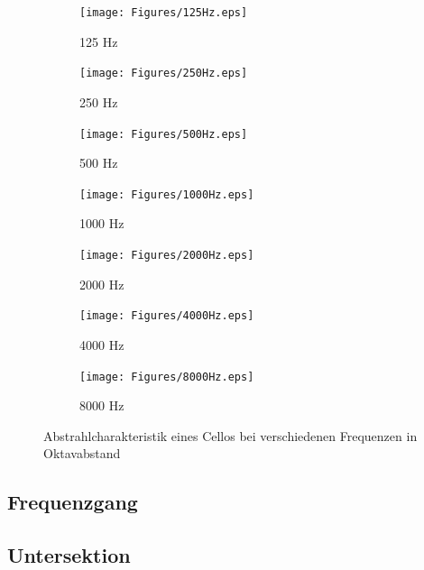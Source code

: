 \begin{figure}[bth]
    \centering
    \begin{subfigure}{.5\textwidth}
        \centering
        \caption{125 Hz}
        \texttt{[image: Figures/125Hz.eps]}
    \end{subfigure}%
    \begin{subfigure}{.5\textwidth}
        \centering
        \caption{250 Hz}
        \texttt{[image: Figures/250Hz.eps]}
    \end{subfigure}

    \begin{subfigure}{.5\textwidth}
        \centering
        \caption{500 Hz}
        \texttt{[image: Figures/500Hz.eps]}
    \end{subfigure}%
    \begin{subfigure}{.5\textwidth}
        \centering
        \caption{1000 Hz}
        \texttt{[image: Figures/1000Hz.eps]}
    \end{subfigure}

    \begin{subfigure}{.5\textwidth}
        \centering
        \caption{2000 Hz}
        \texttt{[image: Figures/2000Hz.eps]}
    \end{subfigure}%
    \begin{subfigure}{.5\textwidth}
        \centering
        \caption{4000 Hz}
        \texttt{[image: Figures/4000Hz.eps]}
    \end{subfigure}

    \begin{subfigure}{.5\textwidth}
        \centering
        \caption{8000 Hz}
        \texttt{[image: Figures/8000Hz.eps]}
    \end{subfigure}

    \caption{Abstrahlcharakteristik eines Cellos bei verschiedenen Frequenzen in Oktavabstand}
    \label{fig:balloon}
\end{figure}


\subsection{Frequenzgang}
\label{subsec:b}
\blindtext


\subsection{Untersektion}
\label{subsec:c}

